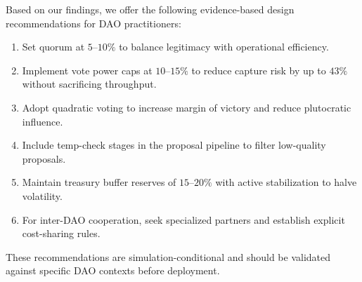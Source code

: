 Based on our findings, we offer the following evidence-based design recommendations for DAO practitioners:

\begin{enumerate}
    \item Set quorum at $5$--$10\%$ to balance legitimacy with operational efficiency.
    \item Implement vote power caps at $10$--$15\%$ to reduce capture risk by up to $43\%$ without sacrificing throughput.
    \item Adopt quadratic voting to increase margin of victory and reduce plutocratic influence.
    \item Include temp-check stages in the proposal pipeline to filter low-quality proposals.
    \item Maintain treasury buffer reserves of $15$--$20\%$ with active stabilization to halve volatility.
    \item For inter-DAO cooperation, seek specialized partners and establish explicit cost-sharing rules.
\end{enumerate}

These recommendations are simulation-conditional and should be validated against specific DAO contexts before deployment.
